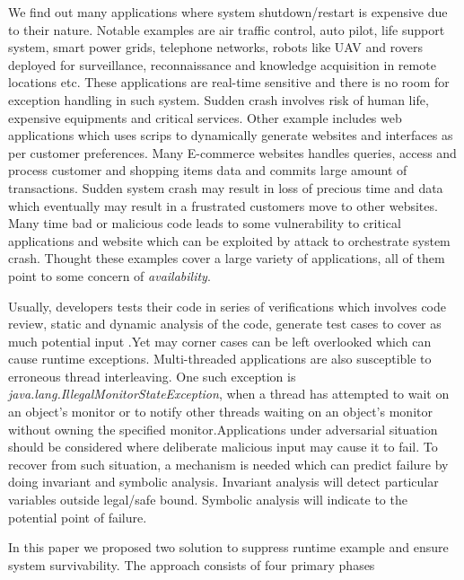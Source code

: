 \documentclass{sigplanconf}
\begin{document}
We find out many applications where system shutdown/restart is expensive due to their nature. Notable examples are air traffic control, auto pilot, life support system, smart power grids, telephone networks, robots like UAV and rovers deployed for surveillance, reconnaissance and knowledge acquisition in remote locations etc. These applications are real-time sensitive and there is no room for exception handling in such system. Sudden crash involves risk of human life, expensive equipments and critical services. Other example includes web applications which uses scrips to dynamically generate websites and interfaces as per customer preferences. Many E-commerce websites handles queries, access and process customer and shopping items data and commits large amount of transactions. Sudden system crash may result in loss of precious time and data which eventually may result in a frustrated customers move to other websites. Many time bad or malicious code leads to some vulnerability to critical applications and website which can be exploited by attack to orchestrate system crash. Thought these examples cover a large variety of applications, all of them point to some concern of \emph{availability}.

Usually, developers tests their code in series of verifications which involves code review, static and dynamic analysis of the code, generate test cases to cover as much potential input .Yet may corner cases can be left overlooked which can cause runtime exceptions. Multi-threaded applications are also susceptible to erroneous thread interleaving. One such exception is \emph{java.lang.IllegalMonitorStateException}, when a thread has attempted to wait on an object's monitor or to notify other threads waiting on an object's monitor without owning the specified monitor.Applications under adversarial situation should be considered where deliberate malicious input may cause it to fail. To recover from such situation, a mechanism is needed which can predict failure by doing invariant and symbolic analysis. Invariant analysis will detect particular variables outside legal/safe bound. Symbolic analysis will indicate to the potential point of failure. 

In this paper we proposed two solution to suppress runtime example and ensure system survivability. The approach consists of four primary phases
\end{document}
